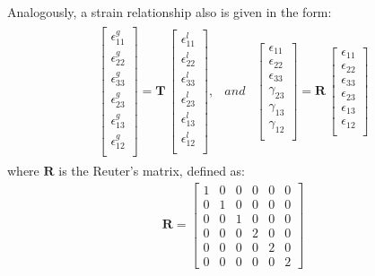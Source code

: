 \documentclass[a4paper,fleqn]{cas-sc}
\begin{document}
Analogously, a strain relationship also is given in the form:
\begin{eqnarray}
	\begin{array}{ccc}
		\left [
		\begin{array}{c}
			\epsilon^g_{11}\\
			\epsilon^g_{22}\\ 
			\epsilon^g_{33}\\ 
			\epsilon^g_{23}\\
			\epsilon^g_{13}\\
			\epsilon^g_{12}\\
		\end{array}
		\right ]=
		\textbf{T}\,\left [
		\begin{array}{c}
			\epsilon^l_{11}\\
			\epsilon^l_{22}\\ 
			\epsilon^l_{33}\\
			\epsilon^l_{23}\\
			\epsilon^l_{13}\\
			\epsilon^l_{12}\\
		\end{array}
		\right ], & and & \left [
		\begin{array}{c}
			\epsilon_{11}\\
			\epsilon_{22}\\ 
			\epsilon_{33}\\ 
			\gamma_{23}\\
			\gamma_{13}\\
			\gamma_{12}\\
		\end{array}
		\right ]=
		\textbf{R}\,\left [
		\begin{array}{c}
			\epsilon_{11}\\
			\epsilon_{22}\\ 
			\epsilon_{33}\\
			\epsilon_{23}\\
			\epsilon_{13}\\
			\epsilon_{12}\\
		\end{array}
		\right ]
	\end{array}
	\label{eq:strain}
\end{eqnarray}
where \(\textbf{R}\) is the Reuter's matrix, defined as:
\begin{eqnarray}
	\textbf{R} = \left [
	\begin{array}{cccccc}
		1 & 0 & 0 & 0 & 0 & 0\\
		0 & 1 & 0 & 0 & 0 & 0\\
		0 & 0  & 1 & 0 & 0 & 0\\
		0 & 0 & 0 & 2 & 0 & 0\\
		0 & 0 & 0 & 0 & 2 & 0\\
		0 & 0 & 0 & 0 & 0 & 2
	\end{array}
	\right ]
	\label{eq:reuters}
\end{eqnarray}
\end{document}
